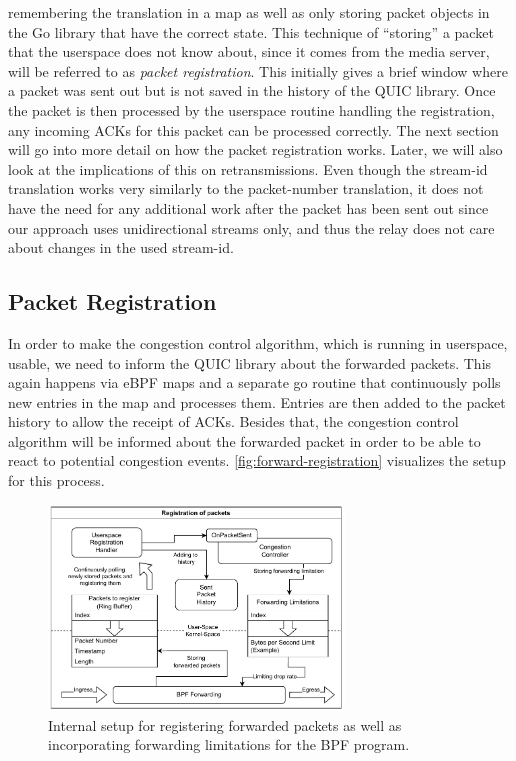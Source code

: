 remembering the translation in a map as well as only storing packet objects in the 
Go library that have the correct state.
This technique of ``storing'' a packet that the userspace does not know
about, since it comes from the media server, will be referred to as \textit{packet registration}.
This initially gives a brief window where a packet was sent out but is not saved in the history
of the QUIC library.
Once the packet is then processed by the userspace routine handling the 
registration, any incoming ACKs for this packet can be processed correctly.
The next section will go into more detail on how the packet registration works.
Later, we will also look at the implications of this on retransmissions.
Even though the stream-id translation works very similarly to the packet-number translation, it 
does not have the need for any additional work after the packet has been sent out since our 
approach uses unidirectional streams only, and thus the relay does not care about changes in 
the used stream-id. %

\subsection{Packet Registration}
In order to make the congestion control algorithm, which is running in userspace,
usable, we need to inform the QUIC library about the forwarded packets.
This again happens via eBPF maps and a separate go routine that continuously
polls new entries in the map and processes them.
Entries are then added to the packet history to allow the receipt of ACKs.
Besides that, the congestion control algorithm will be informed about the
forwarded packet in order to be able to react to potential congestion events.
\autoref{fig:forward-registration} visualizes the setup for this process.
\vspace{0.5cm}
\begin{figure}[H]
    \centering
    \includegraphics[width=0.7\textwidth]{figures/03_fast_relays/forward-registration.drawio.pdf}
    \caption[Packet registration schematic]{Internal setup for registering forwarded packets as well as incorporating forwarding
    limitations for the BPF program.}\label{fig:forward-registration}
\end{figure}

